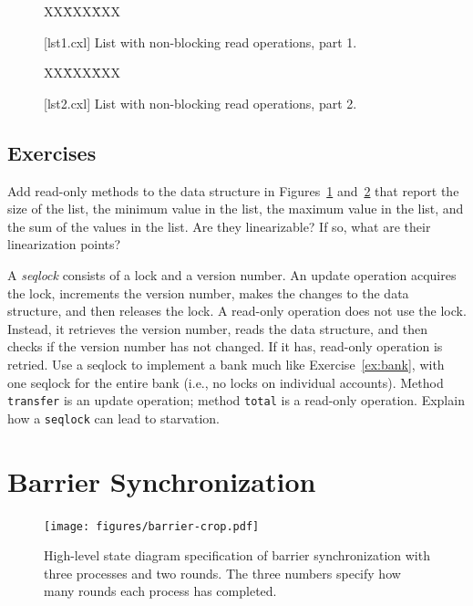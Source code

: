 \documentclass{report}
\newcommand{\cxlsource}[1]{
\begin{tabbing}
XX\=XXX\=XXX\kill
    
\end{tabbing}
}
\newenvironment{code}{
\tcolorbox
}{
\endtcolorbox
}
\begin{document}
\begin{figure}
\begin{code}
\cxlsource{lst1}
\end{code}
\caption{[lst1.cxl] List with non-blocking read operations, part 1.}
\label{fig:lst1}
\end{figure}

\begin{figure}
\begin{code}
\cxlsource{lst2}
\end{code}
\caption{[lst2.cxl] List with non-blocking read operations, part 2.}
\label{fig:lst2}
\end{figure}

\section*{Exercises}
\begin{problems}
\item Add read-only methods to the data structure in Figures~\ref{fig:lst1}
and~\ref{fig:lst2} that report the size of the list, the minimum value in the
list, the maximum value in the list, and the sum of the values in the list.
Are they linearizable?  If so, what are their linearization points?
\item A \emph{seqlock}
consists of a lock and a version number.
An update operation acquires the lock, increments the version number, makes the
changes to the data structure, and then releases the lock.  A read-only operation
does not use the lock.  Instead, it retrieves the version number,
reads the data structure, and then checks if the
version number has not changed.  If it has, read-only operation is retried.
Use a seqlock to implement a bank much like Exercise~\ref{ex:bank}, with
one seqlock for the entire bank (i.e., no locks on individual accounts).
Method \texttt{transfer} is an update operation; method \texttt{total} is a
read-only operation.  Explain how a \texttt{seqlock} can lead to starvation.
\end{problems}

\chapter{Barrier Synchronization}
\label{ch:barrier}


\begin{figure}
\begin{center}
\texttt{[image: figures/barrier-crop.pdf]}
\end{center}
\caption{High-level state diagram specification of barrier synchronization
with three processes and two rounds.  The three numbers specify how many
rounds each process has completed.}
\label{fig:barrierdiagram}
\end{figure}
\end{document}
